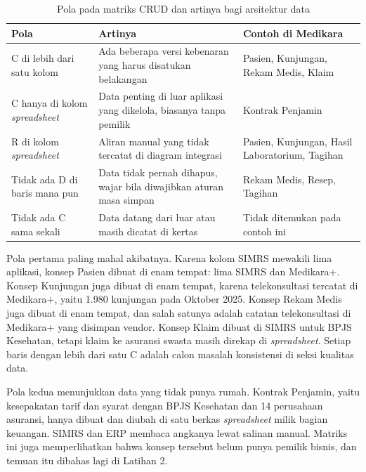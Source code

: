 \begin{table}[!htb]
  \centering
  \caption{Pola pada matriks CRUD dan artinya bagi arsitektur data}
  \label{tab:ch06-pola-crud}
  \begin{tabularx}{\textwidth}{XXX}
    \hline
    \textbf{Pola} & \textbf{Artinya} & \textbf{Contoh di Medikara} \\
    \hline
    C di lebih dari satu kolom & Ada beberapa versi kebenaran yang harus
      disatukan belakangan & Pasien, Kunjungan, Rekam Medis, Klaim \\
    \hline
    C hanya di kolom \textit{spreadsheet} & Data penting di luar aplikasi yang
      dikelola, biasanya tanpa pemilik & Kontrak Penjamin \\
    \hline
    R di kolom \textit{spreadsheet} & Aliran manual yang tidak tercatat di
      diagram integrasi & Pasien, Kunjungan, Hasil Laboratorium, Tagihan \\
    \hline
    Tidak ada D di baris mana pun & Data tidak pernah dihapus, wajar bila
      diwajibkan aturan masa simpan & Rekam Medis, Resep, Tagihan \\
    \hline
    Tidak ada C sama sekali & Data datang dari luar atau masih dicatat di
      kertas & Tidak ditemukan pada contoh ini \\
    \hline
  \end{tabularx}
\end{table}

Pola pertama paling mahal akibatnya. Karena kolom SIMRS mewakili lima
aplikasi, konsep Pasien dibuat di enam tempat: lima SIMRS dan Medikara+. Konsep
Kunjungan juga dibuat di enam tempat, karena telekonsultasi tercatat di
Medikara+, yaitu 1.980 kunjungan pada Oktober 2025. Konsep Rekam Medis juga
dibuat di enam tempat, dan salah satunya adalah catatan telekonsultasi di
Medikara+ yang disimpan vendor. Konsep Klaim
dibuat di SIMRS untuk BPJS Kesehatan, tetapi klaim ke asuransi swasta masih
direkap di \textit{spreadsheet}. Setiap baris dengan lebih dari satu C adalah
calon masalah konsistensi di seksi kualitas data.

Pola kedua menunjukkan data yang tidak punya rumah. Kontrak Penjamin, yaitu
kesepakatan tarif dan syarat dengan BPJS Kesehatan dan 14 perusahaan asuransi,
hanya dibuat dan diubah di satu berkas \textit{spreadsheet} milik bagian
keuangan. SIMRS dan ERP membaca angkanya lewat salinan manual. Matriks ini
juga memperlihatkan bahwa konsep tersebut belum punya pemilik bisnis, dan
temuan itu dibahas lagi di Latihan 2.

